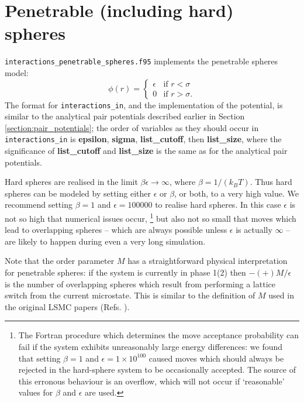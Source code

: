 \documentclass{report}
\begin{document}
\section{Penetrable (including hard) spheres}
\texttt{interactions\_penetrable\_spheres.f95} implements the penetrable spheres model:
\begin{equation}
\phi(r)=
\begin{cases} 
\epsilon & \text{if }r<\sigma \\
0 & \text{if }r>\sigma.
\end{cases}
\end{equation}
The format for \texttt{interactions\_in}, and the implementation of the potential, is similar to the analytical pair potentials 
described earlier in Section \ref{section:pair_potentials}; the order of variables as they should occur in \texttt{interactions\_in} 
is \textbf{epsilon}, \textbf{sigma}, \textbf{list\_cutoff}, then \textbf{list\_size}, where the significance of 
\textbf{list\_cutoff} and \textbf{list\_size} is the same as for the analytical pair potentials.

Hard spheres are realised in the limit $\beta\epsilon\to\infty$, where $\beta=1/(k_BT)$. Thus hard spheres can be modeled by 
setting either $\epsilon$ or $\beta$, or both, to a very high value. We recommend setting $\beta=1$ and $\epsilon=100000$ to realise
hard spheres. In this case $\epsilon$ is not so high that numerical issues occur,
\footnote{The Fortran procedure which determines the move acceptance probability can fail if the system exhibits
unreasonably large energy differences: we found that setting $\beta=1$ and $\epsilon=1\times 10^{100}$ caused moves which should always
be rejected in the hard-sphere system to be occasionally accepted. The source of this erronous behaviour is an overflow, which will
not occur if `reasonable' values for $\beta$ and $\epsilon$ are used.} 
but also not so small that moves which lead to overlapping spheres -- which are always possible unless $\epsilon$ is actually
$\infty$ -- are likely to happen during even a very long simulation.

Note that the order parameter $M$ has a straightforward physical interpretation for penetrable spheres: if the system is
currently in phase 1(2) then $-(+)M/\epsilon$ is the number of overlapping spheres which result from performing a lattice switch from the 
current microstate. This is similar to the definition of $M$ used in the original LSMC papers (Refs. \cite{Bruce_1997,Bruce_2000}).
\end{document}
